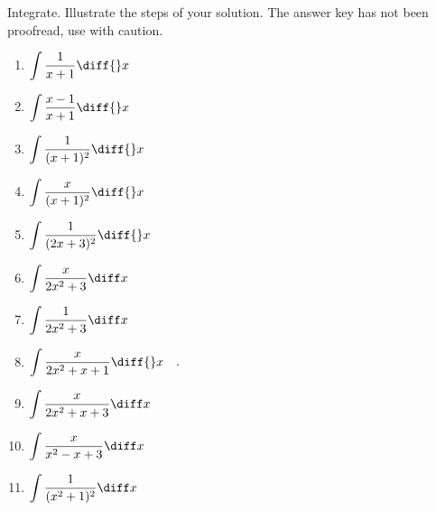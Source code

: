 Integrate. Illustrate the steps of your solution. The answer key has not been proofread, use with caution.
\begin{multicols}{2}
\begin{enumerate}
\item $\displaystyle \int \frac{1}{x+1}\diff {}x$

\item $\displaystyle \int \frac{x-1}{x+1}\diff {}x$


\item $\displaystyle \int \frac{ 1}{(x+1)^2}\diff {}x$


\item $\displaystyle \int \frac{x}{(x+1)^2}\diff {}x$


\item $\displaystyle \int \frac{ 1}{ (2x+3)^2}\diff {}x$

\item $\displaystyle
\int \frac{x}{ 2x^2+3}\diff x
$


\item $\displaystyle
\int \frac{1}{ 2x^2+3}\diff x
$


\item \label{problemIntegrate x/(2x^2+x+1) dx'}
$\displaystyle\int \frac{x }{2x^2+x+1}\diff{}x\quad .
$



\item $\displaystyle
\int \frac{x}{ 2x^2+x+3}\diff x
$

\item $\displaystyle
\int \frac{x}{ x^2-x+3}\diff x
$

\item $\displaystyle
\int \frac{1}{ (x^2+1)^2}\diff x
$


\end{enumerate}
\end{multicols}
